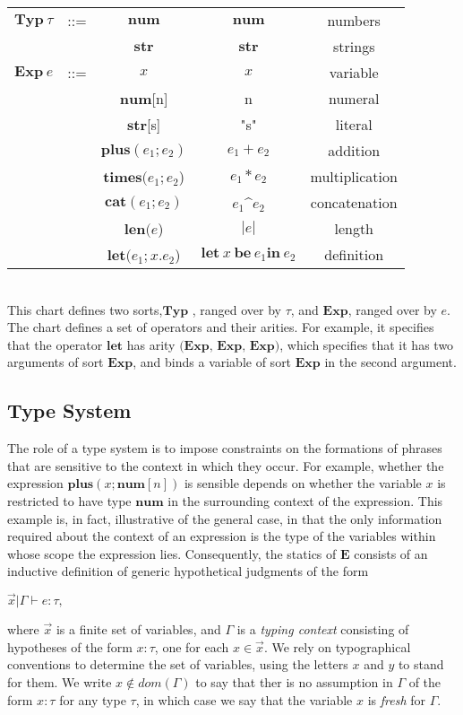 \begin{tabular}{ccccc}
    $\mathbf{Typ} \ \tau$& ::= & $\mathbf{num}$ & $\mathbf{num}$ & numbers\\ 
    &  & $\mathbf{str}$ & $\mathbf{str}$ & strings\\ 
    $\mathbf{Exp} \ e$ &  ::= & $x$ & $x$ & variable\\ 
    &  & $\mathbf{num}$[n] & n & numeral \\ 
    &  & $\mathbf{str}$[s] & "s" & literal\\ 
    &  & $\mathbf{plus}(e_1;e_2)$ & $e_1+e_2$ & addition\\ 
    &  & $\mathbf{times}(e_1;e_2$) & $e_1*e_2$ & multiplication\\ 
    &  & $\mathbf{cat}(e_1;e_2)$ & $e_1$\textasciicircum$ e_2$ & concatenation\\ 
    &  & $\mathbf{len}(e$) & $|e|$ & length\\ 
    &  & $\mathbf{let}(e_1;x.e_2$) & $\mathbf{let} \ x \ \mathbf{be}\  e_1 \textbf{in} \ e_2$ & definition\\ 
\end{tabular} \\


This chart defines two sorts,$\mathbf{Typ}$ , ranged over by $\tau$, and $\mathbf{Exp}$, ranged over by $e$. The
chart defines a set of operators and their arities. For example, it specifies that the operator $\mathbf{let}$ has arity $\textbf{(Exp, Exp, Exp)}$, which specifies that it has
two arguments of sort $\textbf{Exp}$, and binds a variable of sort $\mathbf{Exp}$ in the second argument.


\subsection{Type System}
The role of a type system is to impose constraints on the formations of phrases that are sensitive to the context in which they occur. For example, whether the expression $\mathbf{plus}(x;\mathbf{num}[n])$ is sensible depends on whether the variable $x$ is restricted to have
type $\mathbf{num}$ in the surrounding context of the expression. This example is, in fact,
illustrative of the general case, in that the only information required about the context of
an expression is the type of the variables within whose scope the expression lies.
Consequently, the statics of $\mathbf{E}$ consists of an inductive definition of generic hypothetical
judgments of the form
\begin{center}
    $\overrightarrow{x}|\Gamma \vdash e:\tau,$
\end{center}
where $\overrightarrow{x}$ is a finite set of variables, and $\Gamma$ is a \textit{typing context} consisting of hypotheses of the form $x:\tau$, one for each $x\in\overrightarrow{x}$. We rely on typographical conventions to determine the set of variables, using the letters $x$ and $y$ to stand for them. We write $x \notin \mathit{dom}(\Gamma)$ to say that ther is no assumption in $\Gamma$ of the form $x:\tau$ for any type $\tau$, in which case we say that the variable $x$ is \textit{fresh} for $\Gamma$.

